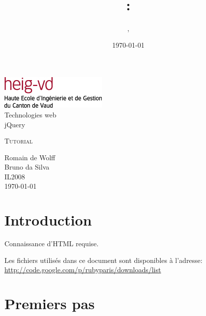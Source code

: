 \documentclass[10pt,a4paper,titlepage]{article}
\author{\auteurOne, \auteurTwo}
\title{\branchetag : \laboname}
\date{\today}
\newcommand{\branche}{Technologies web}
\newcommand{\laboname}{jQuery}
\newcommand{\auteurOne}{Romain de Wolff}
\newcommand{\auteurTwo}{Bruno da Silva}
\newcommand{\promo}{IL2008}
\begin{document}
\pagestyle{headings}
\begin{titlepage}
	\begin{center}
	\includegraphics{img/logo-HEIG-VD.jpg}\\
		\vspace{3cm}
		\LARGE \branche %
		\vspace{3cm}\\
		\Huge \laboname \\
		\vspace{3cm}

		\Large \textsc{Tutorial} \\
		\vspace{3cm}

		\large \auteurOne \\
		\auteurTwo \\	
		\vspace{10pt}
		\normalsize \textsc{\promo} \\

		\vspace{2cm}
		\today
	\end{center}
\end{titlepage}

\tableofcontents

\newpage
\pagestyle{fancy}

\section{Introduction}

Connaissance d'HTML requise.

Les fichiers utilisés dans ce document sont disponibles à l'adresse: \\ \url{http://code.google.com/p/rubyparis/downloads/list}

\newpage
\section{Premiers pas}
\end{document}
